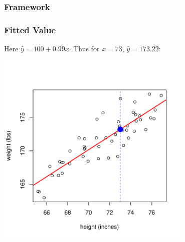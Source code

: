 \documentclass[handout]{beamer}
\newcommand{\blue}[1]{\textcolor{blue2}{#1}}
\begin{document}
\begin{frame}
\frametitle{Framework}
%
%
\end{frame}


\begin{frame}
\frametitle{Fitted Value}
Here $\widehat{y} = 100 + 0.99 x$.  Thus for $x=73$, $\widehat{y}=173.22$:
\begin{center}
\includegraphics[width=0.7\textwidth]{figure/average.pdf}
\end{center}
\end{frame}
\end{document}
